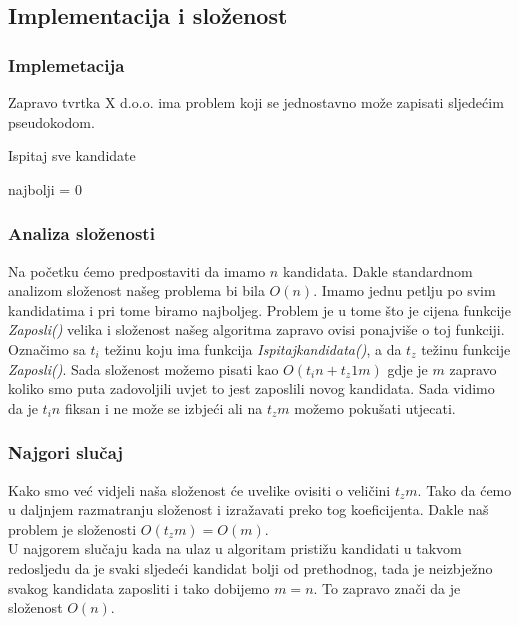 \documentclass[10pt,a4paper]{article}
\begin{document}
\subsection{Implementacija i složenost}

\subsubsection{Implemetacija} 

Zapravo tvrtka X d.o.o. ima problem koji se jednostavno može zapisati sljedećim pseudokodom.
\begin{algorithm}[H]
\caption{Ispitaj sve kandidate}
najbolji = 0\;
\end{algorithm}

\subsubsection{Analiza složenosti}
Na početku ćemo predpostaviti da imamo $n$ kandidata. Dakle standardnom analizom složenost našeg 
problema bi bila $O(n)$. Imamo jednu petlju po svim kandidatima i pri tome biramo najboljeg. 
Problem je u tome što je cijena funkcije \textit{Zaposli()} velika i složenost našeg algoritma 
zapravo ovisi ponajviše o toj funkciji.\\
Označimo sa $t_i$ težinu koju ima funkcija \textit{Ispitajkandidata()}, a da $t_z$ težinu funkcije 
\textit{Zaposli()}. Sada složenost možemo pisati kao $O(t_in + t_z1m)$ gdje je $m$ zapravo koliko 
smo puta zadovoljili uvjet to jest zaposlili novog kandidata. Sada vidimo da je $t_in$ fiksan i ne 
može se izbjeći ali na $t_zm$ možemo pokušati utjecati.
\subsubsection*{Najgori slučaj}
Kako smo već vidjeli naša složenost će uvelike ovisiti o veličini $t_zm$. 
Tako da ćemo u daljnjem razmatranju složenost i izražavati preko tog koeficijenta. Dakle naš problem 
je složenosti $O(t_zm)=O(m)$. \\
U najgorem slučaju kada na ulaz u algoritam pristižu kandidati u takvom redosljedu da je svaki sljedeći 
kandidat bolji od prethodnog, tada je neizbježno svakog kandidata zaposliti i tako dobijemo $m=n$. 
To zapravo znači da je složenost $O(n)$.
\end{document}
